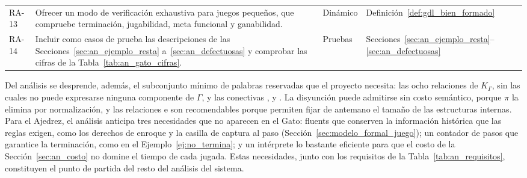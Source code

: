 \begin{table}[htbp]
\begin{tabularx}{\textwidth}{@{}l >{\raggedright\arraybackslash}p{5.6cm} >{\raggedright\arraybackslash}p{1.9cm} Y@{}}
RA-13 & Ofrecer un modo de verificación exhaustiva para juegos pequeños, que compruebe terminación, jugabilidad, meta funcional y ganabilidad. & Dinámico & Definición~\ref{def:gdl_bien_formado} \\
RA-14 & Incluir como casos de prueba las descripciones de las Secciones~\ref{sec:an_ejemplo_resta} a~\ref{sec:an_defectuosas} y comprobar las cifras de la Tabla~\ref{tab:an_gato_cifras}. & Pruebas & Secciones~\ref{sec:an_ejemplo_resta}--\ref{sec:an_defectuosas} \\
\bottomrule
\end{tabularx}
\end{table}

Del análisis se desprende, además, el subconjunto mínimo de palabras reservadas que el proyecto necesita: las ocho relaciones de $K_\Gamma$, sin las cuales no puede expresarse ninguna componente de $\Gamma$, y las conectivas \kw{<=},  y . La disyunción  puede admitirse sin costo semántico, porque $\pi$ la elimina por normalización, y las relaciones  e  son recomendables porque permiten fijar de antemano el tamaño de las estructuras internas. Para el Ajedrez, el análisis anticipa tres necesidades que no aparecen en el Gato: fluents que conserven la información histórica que las reglas exigen, como los derechos de enroque y la casilla de captura al paso (Sección~\ref{sec:modelo_formal_juego}); un contador de pasos que garantice la terminación, como en el Ejemplo~\ref{ej:no_termina}; y un intérprete lo bastante eficiente para que el costo de la Sección~\ref{sec:an_costo} no domine el tiempo de cada jugada. Estas necesidades, junto con los requisitos de la Tabla~\ref{tab:an_requisitos}, constituyen el punto de partida del resto del análisis del sistema.
